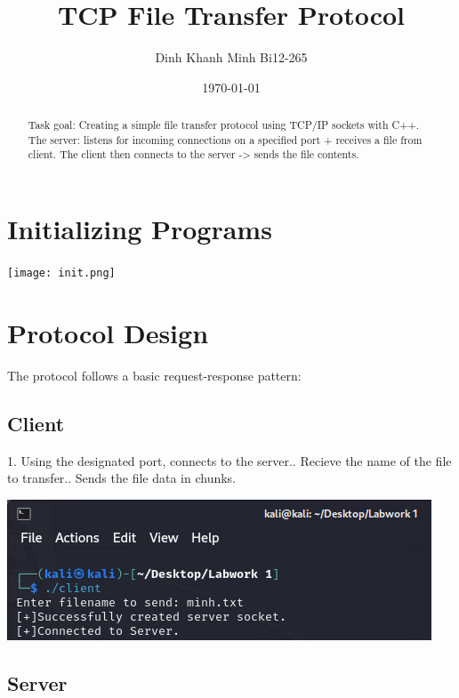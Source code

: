 \documentclass{article}
\begin{document}
\title{TCP File Transfer Protocol}
\author{Dinh Khanh Minh Bi12-265}
\date{\today}

\maketitle

\begin{abstract}
Task goal: Creating a simple file transfer protocol using TCP/IP sockets with C++. \newline 
The server: listens for incoming connections on a specified port + receives a file from client. \newline
The client then connects to the server -> sends the file contents.
\end{abstract}

\section{Initializing Programs}

\texttt{[image: init.png]}

\section{Protocol Design}

The protocol follows a basic request-response pattern:

\subsection{Client}

1. Using the designated port, connects to the server.. Recieve the name of the file to transfer.. Sends the file data in chunks.\newline 

\includegraphics[width=1\linewidth]{client.png}
\subsection{Server}
\end{document}
